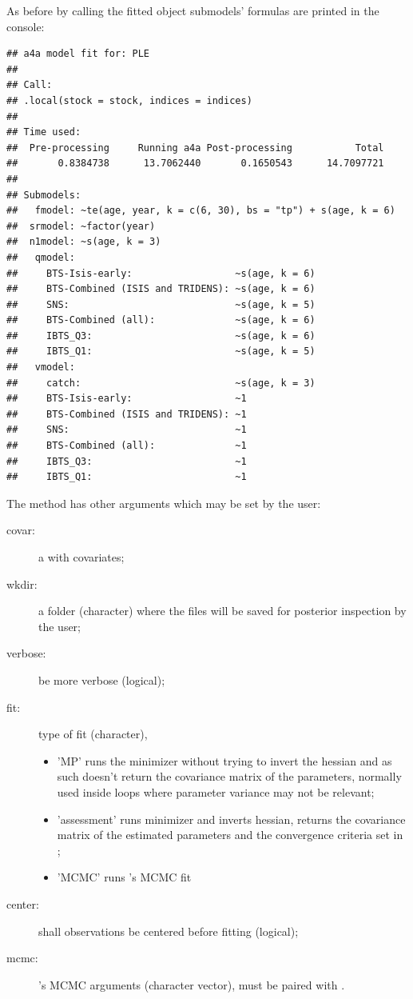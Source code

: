 \documentclass[a4paper,english,11pt]{article}
\begin{document}
As before by calling the fitted object submodels' formulas are printed in the console:

\begin{knitrout}
\color{fgcolor}\begin{kframe}
\begin{alltt}
\end{alltt}
\begin{verbatim}
## a4a model fit for: PLE 
## 
## Call:
## .local(stock = stock, indices = indices)
## 
## Time used:
##  Pre-processing     Running a4a Post-processing           Total 
##       0.8384738      13.7062440       0.1650543      14.7097721 
## 
## Submodels:
## 	 fmodel: ~te(age, year, k = c(6, 30), bs = "tp") + s(age, k = 6)
## 	srmodel: ~factor(year)
## 	n1model: ~s(age, k = 3)
## 	 qmodel:
## 	   BTS-Isis-early:                  ~s(age, k = 6)
## 	   BTS-Combined (ISIS and TRIDENS): ~s(age, k = 6)
## 	   SNS:                             ~s(age, k = 5)
## 	   BTS-Combined (all):              ~s(age, k = 6)
## 	   IBTS_Q3:                         ~s(age, k = 6)
## 	   IBTS_Q1:                         ~s(age, k = 5)
## 	 vmodel:
## 	   catch:                           ~s(age, k = 3)
## 	   BTS-Isis-early:                  ~1
## 	   BTS-Combined (ISIS and TRIDENS): ~1
## 	   SNS:                             ~1
## 	   BTS-Combined (all):              ~1
## 	   IBTS_Q3:                         ~1
## 	   IBTS_Q1:                         ~1
\end{verbatim}
\end{kframe}
\end{knitrout}

The method  has other arguments which may be set by the user:

\begin{description}
	\item [covar:] a  with covariates; 
	\item [wkdir:] a folder (character) where the \ADMB files will be saved for posterior inspection by the user;
	\item [verbose:] be more verbose (logical);
	\item [fit:] type of fit (character), 
	\begin{itemize}
	  \item 'MP' runs the minimizer without trying to invert the hessian and as such doesn't return the covariance matrix of the parameters, normally used inside \MSE loops where parameter variance may not be relevant; 
	  \item 'assessment' runs minimizer and inverts hessian, returns the covariance matrix of the estimated parameters and the convergence criteria set in \ADMB; 
	  \item 'MCMC' runs \ADMB's MCMC fit
	\end{itemize} 
	\item [center:] shall observations be centered before fitting (logical);
	\item [mcmc:] \ADMB's MCMC arguments (character vector), must be paired with . 
\end{description}
\end{document}
